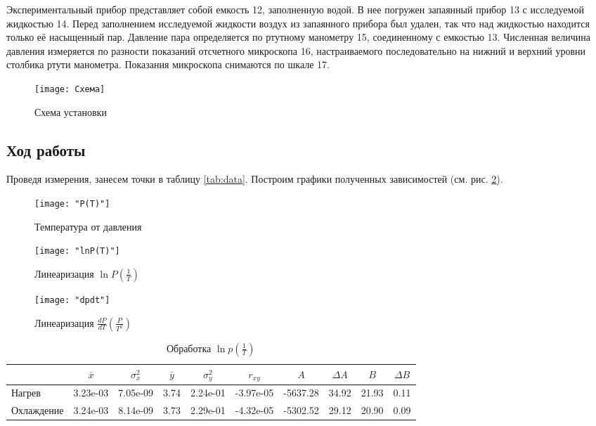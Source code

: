 \documentclass[12pt,a4paper]{article}
\begin{document}
Экспериментальный прибор представляет собой емкость 12, заполненную водой. В нее погружен запаянный прибор 13 с исследуемой жидкостью 14. Перед заполнением исследуемой жидкости воздух из запаянного прибора был удален, так что над жидкостью находится только её насыщенный пар. Давление пара определяется по ртутному манометру 15, соединенному с емкостью 13. Численная величина давления измеряется по разности показаний отсчетного микроскопа 16, настраиваемого последовательно на нижний и верхний уровни столбика ртути манометра. Показания микроскопа снимаются по шкале 17.

\begin{figure}[H]
	\begin{center}
		\texttt{[image: Схема]}
	\end{center}
	\caption{Схема установки}
	\label{img2}
\end{figure}	
	

\subsection*{Ход работы}



Проведя измерения, занесем точки в таблицу \ref{tab:data}. Построим графики полученных зависимостей (см. рис. \ref{fig:pot}). 


\begin{table}

\hspace{\fill}

\end{table}



\begin{figure}
	\centering
	\texttt{[image: "P(T)"]}
	\caption{Температура от давления}
	\label{fig:pot}
\end{figure}

\begin{figure}
	\centering
	\texttt{[image: "lnP(T)"]}
	\caption{Линеаризация $\ln{P}(\frac{1}{T})$}
	\label{fig:lnpot}
\end{figure}

\begin{figure}
	\centering
	\texttt{[image: "dpdt"]}
	\caption{Линеаризация $\frac{dP}{dT}(\frac{P}{T^2})$}
	\label{fig:dpdt}
\end{figure}



\begin{table}
	\caption{Обработка $\ln{p}(\frac{1}{T})$}
	\label{tab:stat}
	\centering
	\footnotesize
	\begin{tabular}{l|ccccccccc}
		\toprule
		$ $ & $\overline{x}$ & $\sigma_x^2$ & $\overline{y}$ & $\sigma_y^2$ & $r_{xy}$ & $A$ & $\Delta A$ & $B$ & $\Delta B$ \\ \midrule
		Нагрев & 3.23e-03 & 7.05e-09 & 3.74 & 2.24e-01 & -3.97e-05 & -5637.28 & 34.92 & 21.93 & 0.11 \\ 
		Охлаждение & 3.24e-03 & 8.14e-09 & 3.73 & 2.29e-01 & -4.32e-05 & -5302.52 & 29.12 & 20.90 & 0.09 \\ \bottomrule
	\end{tabular}
\end{table}
\end{document}
